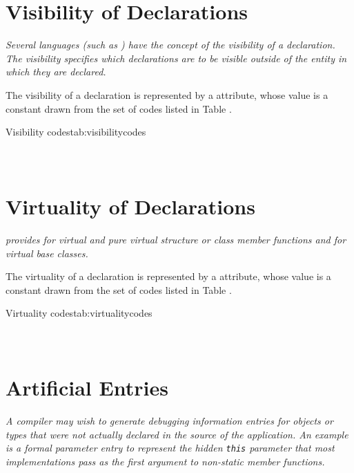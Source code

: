\section{Visibility of Declarations}
\label{chap:visibilityofdeclarations}

\textit{Several languages (such as ) 
have the concept of the visibility of a declaration. The
visibility specifies which declarations are to be 
visible outside of the entity in which they are
declared.}

The\hypertarget{chap:DWATvisibilityvisibilityofdeclaration}{}
visibility of a declaration is represented 
by a \DWATvisibilityDEFN{}
attribute, whose value is a
constant drawn from the set of codes listed in 
Table .

\begin{simplenametable}[1.5in]{Visibility codes}{tab:visibilitycodes}
\DWVISlocalTARG{}          \\
\DWVISexportedTARG{}    \\
\DWVISqualifiedTARG{}  \\
\end{simplenametable}

\section{Virtuality of Declarations}
\label{chap:virtualityofdeclarations}
\textit{ provides for virtual and pure virtual structure or class
member functions and for virtual base classes.}

The\hypertarget{chap:DWATvirtualityvirtualityindication}{}
virtuality of a declaration is represented by a
\DWATvirtualityDEFN{}
attribute, whose value is a constant drawn
from the set of codes listed in 
Table .

\begin{simplenametable}[2.5in]{Virtuality codes}{tab:virtualitycodes}
\DWVIRTUALITYnoneTARG{}                      \\
\DWVIRTUALITYvirtualTARG{}                \\
\DWVIRTUALITYpurevirtualTARG{}    \\
\end{simplenametable}

\section{Artificial Entries}
\label{chap:artificialentries}
\textit{A compiler may wish to generate debugging information entries
for objects or types that were not actually declared in the
source of the application. An example is a formal parameter
entry to represent the hidden 
\texttt{this} parameter
that most  implementations pass as the first argument 
to non-static member functions.}  

